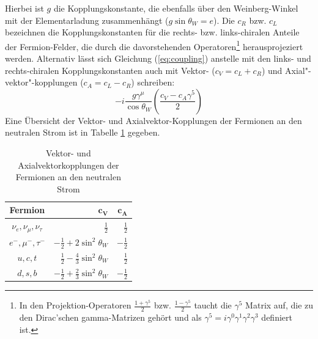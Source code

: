 Hierbei ist $g$ die Kopplungskonstante, die ebenfalls über den Weinberg-Winkel
mit der Elementarladung zusammenhängt ($g\sin\theta_W=e$). Die $c_R$ bzw.
$c_L$ bezeichnen die Kopplungskonstanten für die rechts- bzw. links-chiralen
Anteile der Fermion-Felder, die durch die davorstehenden Operatoren\footnote{In
den Projektion-Operatoren $\frac{1+\gamma^5}{2}$ bzw. $\frac{1-\gamma^5}{2}$
taucht die $\gamma^5$ Matrix auf, die zu den Dirac'schen gamma-Matrizen gehört
und als $\gamma^5=i\gamma^0\gamma^1\gamma^2\gamma^3$ definiert ist.}
herausprojeziert werden.
Alternativ lässt sich Gleichung (\ref{eq:coupling}) anstelle mit den links-
und rechts-chiralen Kopplungskonstanten auch mit Vektor- \mbox{($c_V=c_L+c_R$)}
und Axial"-vektor"-kopplungen \mbox{($c_A=c_L-c_R$)} schreiben:
\begin{equation}
    -i \frac{g\gamma^\mu}{\cos\theta_W} \left( \frac{c_V-c_A\gamma^5}{2}\right)
    \label{eq:vertex}
\end{equation}
Eine Übersicht der Vektor- und Axialvektor-Kopplungen der Fermionen an den
neutralen Strom ist in Tabelle \ref{tab:couplings} gegeben.

\begin{table}[h]
    \centering
    \renewcommand{\arraystretch}{1.4}
    \begin{tabular}{|c|r|r|}
        \hline
        \bf{Fermion} & $\mathbf{c_V}$ & $\mathbf{c_A}$ \\
        \hline \hline
        $\nu_e,\nu_\mu,\nu_\tau$ & $\frac{1}{2}$ & $\frac{1}{2}$ \\
        $e^-,\mu^-,\tau^-$ & $-\frac{1}{2}+2\sin^2\theta_W$ & $-\frac{1}{2}$ \\
        $u,c,t$ & $\frac{1}{2}-\frac{4}{3}\sin^2\theta_W$ & $\frac{1}{2}$   \\
        $d,s,b$ & $-\frac{1}{2}+\frac{2}{3}\sin^2\theta_W$ & $-\frac{1}{2}$ \\
        \hline
    \end{tabular}
    \caption{Vektor- und Axialvektorkopplungen der Fermionen an den neutralen
        Strom}
    \label{tab:couplings}
\end{table}

